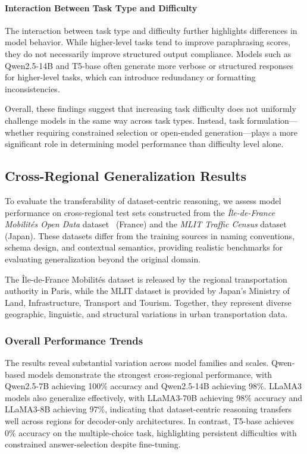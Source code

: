 \documentclass[a4paper,fleqn]{cas-sc}
\begin{document}
\paragraph{Interaction Between Task Type and Difficulty}

The interaction between task type and difficulty further highlights differences in model behavior. While higher-level tasks tend to improve paraphrasing scores, they do not necessarily improve structured output compliance. Models such as Qwen2.5-14B and T5-base often generate more verbose or structured responses for higher-level tasks, which can introduce redundancy or formatting inconsistencies.

Overall, these findings suggest that increasing task difficulty does not uniformly challenge models in the same way across task types. Instead, task formulation—whether requiring constrained selection or open-ended generation—plays a more significant role in determining model performance than difficulty level alone.

\subsection{Cross-Regional Generalization Results}

To evaluate the transferability of dataset-centric reasoning, we assess model performance on cross-regional test sets constructed from the \textit{Île-de-France Mobilités Open Data} dataset~\cite{idfm2024} (France) and the \textit{MLIT Traffic Census} dataset~\cite{mlit2024} (Japan). These datasets differ from the training sources in naming conventions, schema design, and contextual semantics, providing realistic benchmarks for evaluating generalization beyond the original domain.

The Île-de-France Mobilités dataset is released by the regional transportation authority in Paris, while the MLIT dataset is provided by Japan’s Ministry of Land, Infrastructure, Transport and Tourism. Together, they represent diverse geographic, linguistic, and structural variations in urban transportation data.

\subsubsection{Overall Performance Trends}

The results reveal substantial variation across model families and scales. Qwen-based models demonstrate the strongest cross-regional performance, with Qwen2.5-7B achieving 100\% accuracy and Qwen2.5-14B achieving 98\%. LLaMA3 models also generalize effectively, with LLaMA3-70B achieving 98\% accuracy and LLaMA3-8B achieving 97\%, indicating that dataset-centric reasoning transfers well across regions for decoder-only architectures. In contrast, T5-base achieves 0\% accuracy on the multiple-choice task, highlighting persistent difficulties with constrained answer-selection despite fine-tuning.
\end{document}
